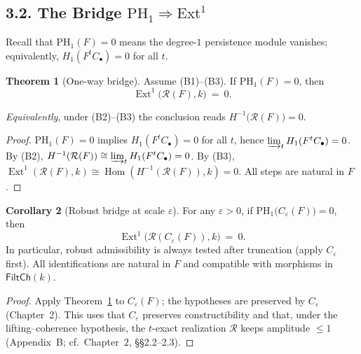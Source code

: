 \documentclass[11pt]{article}
\numberwithin{equation}{section}
\theoremstyle{plain}
\theoremstyle{definition}
\theoremstyle{remark}
\DeclareMathOperator{\Ext}{Ext}
\DeclareMathOperator{\Hom}{Hom}
\theoremstyle{plain}
\theoremstyle{definition}
\numberwithin{equation}{section}
\newtheorem{theorem}{Theorem}[section]
\newtheorem{corollary}[theorem]{Corollary}
\theoremstyle{definition}
\numberwithin{equation}{section}
\theoremstyle{plain}
\theoremstyle{definition}
\theoremstyle{remark}
\begin{document}
\subsection*{3.2. The Bridge \texorpdfstring{$\mathrm{PH}_1\!\Rightarrow\!\mathrm{Ext}^1$}{PH1⇒Ext1}}
Recall that \(\mathrm{PH}_1(F)=0\) means the degree-\(1\) persistence module vanishes; equivalently, \(H_1(F^tC_\bullet)=0\) for all \(t\).

\begin{theorem}[One-way bridge]\label{thm:PH1-to-Ext1}
Assume \textup{(B1)}–\textup{(B3)}. If \(\mathrm{PH}_1(F)=0\), then
\[
\Ext^1\!\big(\mathcal{R}(F),k\big)\ =\ 0.
\]
\end{theorem}

\noindent\emph{Equivalently}, under \textup{(B2)}–\textup{(B3)} the conclusion reads \(H^{-1}\!\big(\mathcal{R}(F)\big)=0\).

\begin{proof}
\(\mathrm{PH}_1(F)=0\) implies \(H_1(F^tC_\bullet)=0\) for all \(t\), hence \(\varinjlim_t H_1(F^tC_\bullet)=0\). By \textup{(B2)}, \(H^{-1}(\mathcal{R}(F))\cong \varinjlim_t H_1(F^tC_\bullet)=0\). By \textup{(B3)}, \(\Ext^1(\mathcal{R}(F),k)\cong \Hom(H^{-1}(\mathcal{R}(F)),k)=0\). All steps are natural in \(F\).
\end{proof}

\begin{corollary}[Robust bridge at scale \(\varepsilon\)]\label{cor:robust-bridge}
For any \(\varepsilon>0\), if \(\mathrm{PH}_1\!\big(C_\varepsilon(F)\big)=0\), then
\[
\Ext^1\!\big(\mathcal{R}(C_\varepsilon(F)),k\big)\ =\ 0.
\]
In particular, robust admissibility is always tested after truncation (apply \(C_\varepsilon\) first).
All identifications are natural in \(F\) and compatible with morphisms in \(\mathsf{FiltCh}(k)\).
\end{corollary}

\begin{proof}
Apply Theorem~\ref{thm:PH1-to-Ext1} to \(C_\varepsilon(F)\); the hypotheses are preserved by \(C_\varepsilon\) (Chapter~2). This uses that \(C_\varepsilon\) preserves constructibility and that, under the lifting–coherence hypothesis, the \(t\)-exact realization \(\mathcal{R}\) keeps amplitude \(\le 1\) (Appendix~B; cf.\ Chapter~2, §§2.2–2.3).
\end{proof}
\end{document}
